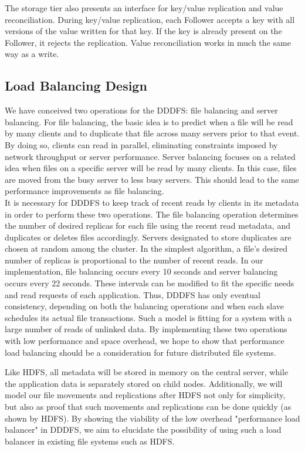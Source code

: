 \documentclass[twoside]{article}
\begin{document}
\begin{multicols}{2}
The storage tier also presents an interface for key/value replication and value reconciliation. During key/value replication, each Follower accepts a key with all versions of the value written for that key. If the key is already present on the Follower, it rejects the replication. Value reconciliation works in much the same way as a write.

\subsection*{Load Balancing Design}
We have conceived two operations for the DDDFS: file balancing and server balancing. For file balancing, the basic idea is to predict when a file will be read by many clients and to duplicate that file across many servers prior to that event. By doing so, clients can read in parallel, eliminating constraints imposed by network throughput or server performance. Server balancing focuses on a related idea when files on a specific server will be read by many clients. In this case, files are moved from the busy server to less busy servers. This should lead to the same performance improvements as file balancing. \\\indent
It is necessary for DDDFS to keep track of recent reads by clients in its metadata in order to perform these two operations.  The file balancing operation determines the number of desired replicas for each file using the recent read metadata, and duplicates or deletes files accordingly. Servers designated to store duplicates are chosen at random among the cluster. In the simplest algorithm, a file's desired number of replicas is proportional to the number of recent reads. In our implementation, file balancing occurs every 10 seconds and server balancing occurs every 22 seconds. These intervals can be modified to fit the specific needs and read requests of each application. Thus, DDDFS has only eventual consistency, depending on both the balancing operations and when each slave schedules its actual file transactions. Such a model is fitting for a system with a large number of reads of unlinked data. By implementing these two operations with low performance and space overhead, we hope to show that performance load balancing should be a consideration for future distributed file systems.

Like HDFS, all metadata will be stored in memory on the central server, while the application data is separately stored on child nodes. Additionally, we will model our file movements and replications after HDFS not only for simplicity, but also as proof that such movements and replications can be done quickly (as shown by HDFS). By showing the viability of the low overhead "performance load balancer" in DDDFS, we aim to elucidate the possibility of using such a load balancer in existing file systems such as HDFS.


\end{multicols}
\end{document}
